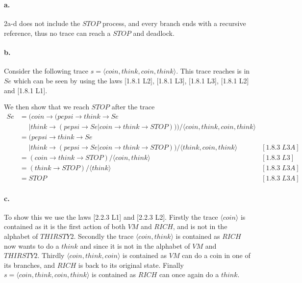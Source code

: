 \documentclass[a4paper, 11pt]{article}
\begin{document}

\section{} %

\paragraph{a.} %
\label{par:aa_}
2a-d does not include the $STOP$ process, and every branch ends with a recursive reference, thus no trace can reach a $STOP$ and deadlock.

\paragraph{b.} %
\label{par:bb_}
Consider the following trace $s = \langle coin, think, coin, think \rangle$. This trace reaches is in $Se$ which can be seen by using the laws [1.8.1 L2], [1.8.1 L3], [1.8.1 L3], [1.8.1 L2] and [1.8.1 L1].

We then show that we reach $STOP$ after the trace
\begin{align*}
Se &= (coin \rightarrow (pepsi \rightarrow think \rightarrow Se \\
   &\phantom{=} | think \rightarrow (pepsi \rightarrow Se | coin \rightarrow think \rightarrow STOP))) / \langle coin, think, coin, think \rangle \\
   &= (pepsi \rightarrow think \rightarrow Se \\
   &\phantom{=} | think \rightarrow (pepsi \rightarrow Se | coin \rightarrow think \rightarrow STOP)) / \langle think, coin, think \rangle & [1.8.3\;L3A] \\
   &= (coin \rightarrow think \rightarrow STOP) / \langle coin, think \rangle & [1.8.3\;L3] \\
   &= (think \rightarrow STOP) / \langle think \rangle & [1.8.3\;L3A] \\
   &= STOP & [1.8.3\;L3A] 
\end{align*}


\paragraph{c.} %
\label{par:cc_}

To show this we use the laws [2.2.3 L1] and [2.2.3 L2]. Firstly the trace $\langle coin \rangle$ is contained as it is the first action of both $VM$ and $RICH$, and is not in the alphabet of $THIRSTY2$. Secondly the trace $\langle coin, think \rangle$ is contained as $RICH$ now wants to do a $think$ and since it is not in the alphabet of $VM$ and $THIRSTY2$. Thirdly $\langle coin, think, coin \rangle$ is contained as $VM$ can do a coin in one of its branches, and $RICH$ is back to its original state. Finally $s = \langle coin, think, coin, think \rangle$ is contained as $RICH$ can once again do a $think$.
\end{document}
